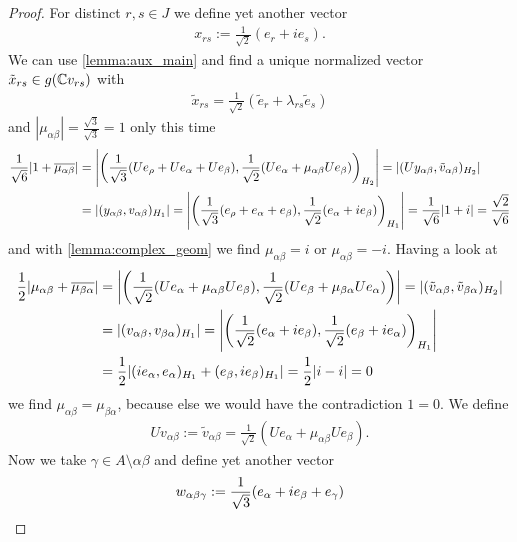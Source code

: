 \begin{proof}
	For distinct $r,s \in J$ we define yet another vector
	\begin{align*}
		x_{rs} := \frac{1}{\sqrt{2}}(e_r + ie_s).
	\end{align*}
	We can use \ref{lemma:aux_main} and find a unique normalized vector $\tilde{x}_{rs} \in g(\mathbb{C} v_{rs})$ with
	\begin{align*}
		\tilde{x}_{rs} = \frac{1}{\sqrt{2}}(\tilde{e}_r + \lambda_{rs} \tilde{e}_s)
	\end{align*}
	and $|\mu_{\alpha \beta}| = \frac{\sqrt{3}}{\sqrt{3}} = 1$ only this time
	\begin{align*}
		\frac{1}{\sqrt{6}} {\left | 1 + \overline{\mu_{\alpha \beta}} \right |} &= {\left | {\left ( \frac{1}{\sqrt{3}} {\left ( Ue_\rho + Ue_\alpha + Ue_\beta \right )}, \frac{1}{\sqrt{2}} {\left ( Ue_\alpha + \mu_{\alpha \beta}Ue_\beta \right )} \right )}_{H_2} \right |} = |(Uy_{\alpha \beta}, \tilde{v}_{\alpha \beta})_{H_2}| \\
		&= |(y_{\alpha \beta}, v_{\alpha \beta})_{H_1}| = {\left | {\left ( \frac{1}{\sqrt{3}} {\left ( e_\rho + e_\alpha + e_\beta \right )}, \frac{1}{\sqrt{2}} (e_\alpha + ie_\beta) \right )}_{H_1} \right |} = \frac{1}{\sqrt{6}}{\left | 1 + i \right |} = \frac{\sqrt{2}}{\sqrt{6}}
	\end{align*}
	and with \ref{lemma:complex_geom} we find $\mu_{\alpha \beta} = i$ or $\mu_{\alpha \beta} = -i$. Having a look at
	\begin{align*}
		\frac{1}{2}{\left | \mu_{\alpha \beta} + \overline{\mu_{\beta \alpha}} \right |} &= {\left | {\left ( \frac{1}{\sqrt{2}}(Ue_\alpha + \mu_{\alpha \beta} Ue_\beta), \frac{1}{\sqrt{2}}(Ue_\beta + \mu_{\beta \alpha} Ue_\alpha) \right )} \right |} = |(\tilde{v}_{\alpha \beta}, \tilde{v}_{\beta \alpha})_{H_2}| \\
		&= |(v_{\alpha \beta}, v_{\beta \alpha})_{H_1}| = {\left | {\left ( \frac{1}{\sqrt{2}}(e_\alpha + ie_\beta), \frac{1}{\sqrt{2}}(e_\beta + ie_\alpha) \right )}_{H_1} \right |} \\
		&= \frac{1}{2} {\left |  (ie_\alpha, e_\alpha)_{H_1} + (e_\beta, ie_\beta)_{H_1} \right |} = \frac{1}{2} {\left | i - i \right |} = 0
	\end{align*}
	we find $\mu_{\alpha \beta} = \mu_{\beta \alpha}$, because else we would have the contradiction $1 = 0$. We define
	\begin{align*}
		Uv_{\alpha \beta} := \tilde{v}_{\alpha \beta} = \frac{1}{\sqrt{2}}(Ue_\alpha + \mu_{\alpha \beta} Ue_\beta).
	\end{align*}
	Now we take $\gamma \in A \setminus{\alpha \beta}$ and define yet another vector
	\begin{align*}
		w_{\alpha \beta \gamma} := \frac{1}{\sqrt{3}} \pbraces{e_\alpha + ie_\beta + e_\gamma}

\end{align*}
\end{proof}
